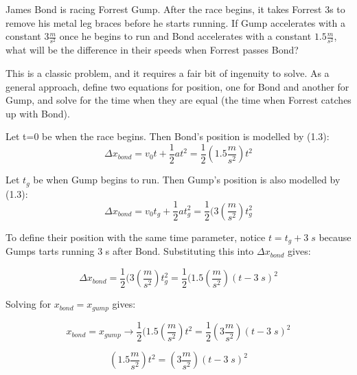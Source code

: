 
\begin{question}
James Bond is racing Forrest Gump. After the race begins, it takes Forrest 3s to remove his metal leg braces before he starts running. If Gump accelerates with a constant $3\frac{m}{s^2}$ once he begins to run and Bond accelerates with a constant $1.5\frac{m}{s^2}$, what will be the difference in their speeds when Forrest passes Bond?
\end{question}

\begin{solution}
This is a classic problem, and it requires a fair bit of ingenuity to solve. As a general approach, define two equations for position, one for Bond and another for Gump, and solve for the time when they are equal (the time when Forrest catches up with Bond).

Let t=0 be when the race begins. Then Bond's position is modelled by (1.3):
\begin{equation*}
    \Delta x_{bond} = v_0t + \frac{1}{2}at^2 = 
    \frac{1}{2}(1.5\frac{m}{s^2})t^2
\end{equation*}

Let $t_g$ be when Gump begins to run. Then Gump's position is also modelled by (1.3):
\begin{equation*}
    \Delta x_{bond} = v_0t_g + \frac{1}{2}at_g^2 = 
    \frac{1}{2}(3(\frac{m}{s^2})t_g^2   
\end{equation*}

To define their position with the same time parameter, notice $t=t_g+3\;s$ because Gumps tarts running 3 s after Bond. Substituting this into $\Delta x_{bond}$ gives:

\begin{equation*}
    \Delta x_{bond} = \frac{1}{2}(3(\frac{m}{s^2})t_g^2  = 
    \frac{1}{2}(1.5(\frac{m}{s^2})(t-3\;s)^2
\end{equation*}

Solving for $x_{bond} = x_{gump}$ gives:

\begin{equation*}
    x_{bond} = x_{gump} \rightarrow
    \frac{1}{2}(1.5(\frac{m}{s^2})t^2 = \frac{1}{2}(3\frac{m}{s^2})(t-3\;s)^2
\end{equation*}

\begin{equation*}
    (1.5\frac{m}{s^2})t^2 = 
    (3\frac{m}{s^2})(t-3\;s)^2
\end{equation*}


\end{solution}

